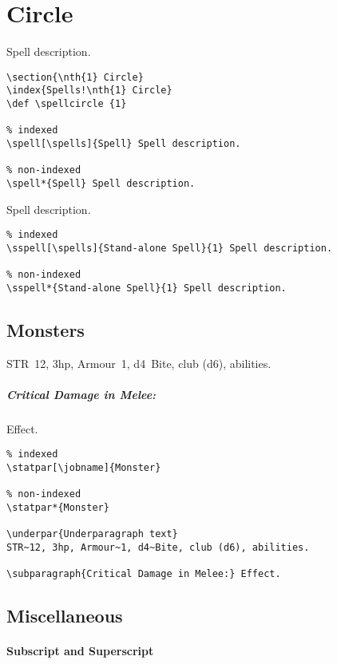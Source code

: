 \documentclass[itdr]{subfiles}
\begin{document}
\section{ Circle}
\def \spellcircle {1}

 Spell description.
\begin{lstlisting}
\section{\nth{1} Circle}
\index{Spells!\nth{1} Circle}
\def \spellcircle {1}

% indexed
\spell[\spells]{Spell} Spell description.

% non-indexed
\spell*{Spell} Spell description.
\end{lstlisting}

 Spell description.
\begin{lstlisting}
% indexed
\sspell[\spells]{Stand-alone Spell}{1} Spell description.

% non-indexed
\sspell*{Stand-alone Spell}{1} Spell description.
\end{lstlisting}

\vfill

\subsection{Monsters}

STR~12, 3hp, Armour~1, d4~Bite, club (d6), abilities.

\subparagraph{Critical Damage in Melee:} Effect.

\begin{lstlisting}
% indexed
\statpar[\jobname]{Monster}

% non-indexed
\statpar*{Monster}

\underpar{Underparagraph text}
STR~12, 3hp, Armour~1, d4~Bite, club (d6), abilities.

\subparagraph{Critical Damage in Melee:} Effect.
\end{lstlisting}
\vspace{-\baselineskip}
\break

\subsection{Miscellaneous}

\paragraph{Subscript and Superscript}
\end{document}
